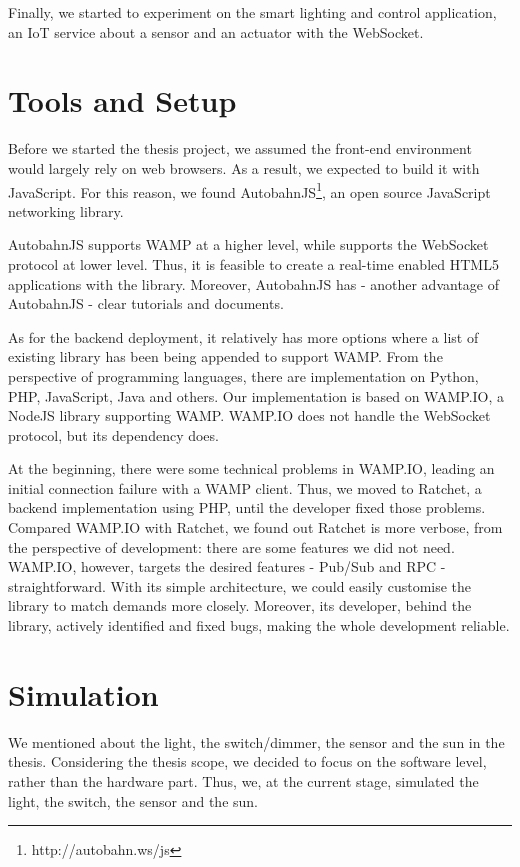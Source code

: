 Finally, we started to experiment on the smart lighting and control application, an IoT service about a sensor and an actuator with the WebSocket. 

\section{Tools and Setup}
Before we started the thesis project, we assumed the front-end environment would largely rely on web browsers. As a result, we expected to build it with JavaScript. For this reason, we found AutobahnJS\footnote{http://autobahn.ws/js}, an open source JavaScript networking library. 

AutobahnJS supports WAMP at a higher level, while supports the WebSocket protocol at lower level. Thus, it is feasible to create a real-time enabled HTML5 applications with the library. Moreover, AutobahnJS has - another advantage of AutobahnJS - clear tutorials and documents.

As for the backend deployment, it relatively has more options where a list of existing library has been being appended to support WAMP. From the perspective of programming languages, there are implementation on Python, PHP, JavaScript, Java and others. Our implementation is based on WAMP.IO, a NodeJS library supporting WAMP. WAMP.IO does not handle the WebSocket protocol, but its dependency does. 

At the beginning, there were some technical problems in WAMP.IO, leading an initial connection failure with a WAMP client. Thus, we moved to Ratchet, a backend implementation using PHP, until the developer fixed those problems. Compared WAMP.IO with Ratchet, we found out Ratchet is more verbose, from the perspective of development: there are some features we did not need. WAMP.IO, however, targets the desired features - Pub/Sub and RPC - straightforward. With its simple architecture, we could easily customise the library to match demands more closely. Moreover, its developer, behind the library, actively identified and fixed bugs, making the whole development reliable. 

\section{Simulation}
We mentioned about the light, the switch/dimmer, the sensor and the sun in the thesis. Considering the thesis scope, we decided to focus on the software level, rather than the hardware part. Thus, we, at the current stage, simulated the light, the switch, the sensor and the sun. 

